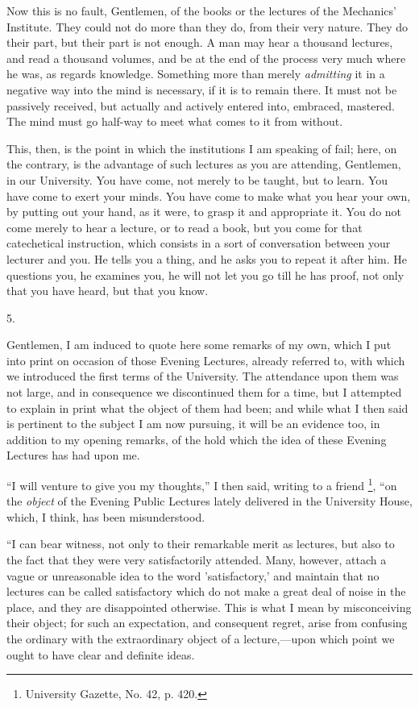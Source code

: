 Now this is no fault, Gentlemen, of the books or the lectures
of the Mechanics' Institute. They could not do more than they do, from
their very nature. They do their part, but their part is not enough. A
man may hear a thousand lectures, and read a thousand volumes, and be
at the end of the process very much where he was, as regards
knowledge. Something more than merely \emph{admitting} it in a
negative way into the mind is necessary, if it is to remain there. It
must not be passively received, but actually and actively entered
into, embraced, mastered. The mind must go half-way to meet what comes
to it from without.

This, then, is the point in which the institutions I am speaking of
fail; here, on the contrary, is the advantage of such lectures as you
are attending, Gentlemen, in our University. You have come, not merely
to be taught, but to learn. You have come to exert your minds. You
have come to make what you hear your own, by putting out your hand, as
it were, to grasp it and appropriate it. You do not come merely to
hear a lecture, or to read a book, but you come for that catechetical
instruction, which consists in a sort of conversation between your
lecturer and you. He tells you a thing, and he asks you to repeat it
after him. He questions you, he examines you, he will not let you go
till he has proof, not only that you have heard, but that you know.

5.

Gentlemen, I am induced to quote here some remarks of my own, which
I put into print on occasion of those Evening Lectures, already
referred to, with which we introduced the first terms of the
University. The attendance upon them was not large, and in consequence
we discontinued them for a time, but I attempted to explain in print
what the object of them had been; and while what I then said is
pertinent to the subject I am now pursuing, it will be an evidence
too, in addition to my opening remarks, of the hold which the idea of
these Evening Lectures has had upon me.

``I will venture to give you my thoughts,'' I then said,
writing to a friend \footnote{University Gazette, No. 42, p. 420.}, ``on the \emph{object} of the Evening Public Lectures lately
delivered in the University House, which, I think, has been
misunderstood.

``I can bear witness, not only to their remarkable merit as
lectures, but also to the fact that they were very satisfactorily
attended. Many, however, attach a vague or unreasonable idea to the
word 'satisfactory,' and maintain that no lectures can be called
satisfactory which do not make a great deal of noise in the place, and
they are disappointed otherwise. This is what I mean by misconceiving
their object; for such an expectation, and consequent regret, arise
from confusing the ordinary with the extraordinary object of a
lecture,—upon which point we ought to have clear and definite ideas.

